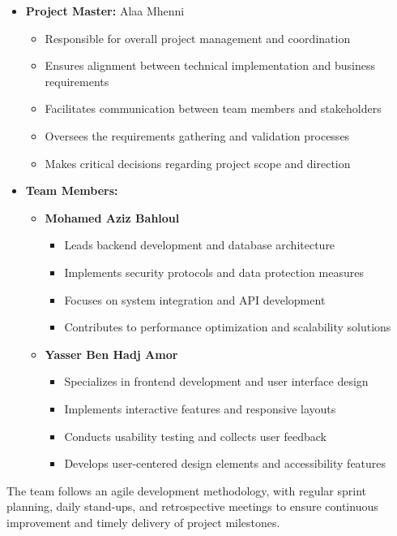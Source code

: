\begin{itemize}
    \item \textbf{Project Master:} Alaa Mhenni
    \begin{itemize}
        \item Responsible for overall project management and coordination
        \item Ensures alignment between technical implementation and business requirements
        \item Facilitates communication between team members and stakeholders
        \item Oversees the requirements gathering and validation processes
        \item Makes critical decisions regarding project scope and direction
    \end{itemize}
    
    \item \textbf{Team Members:}
    \begin{itemize}
        \item \textbf{Mohamed Aziz Bahloul}
        \begin{itemize}
            \item Leads backend development and database architecture
            \item Implements security protocols and data protection measures
            \item Focuses on system integration and API development
            \item Contributes to performance optimization and scalability solutions
        \end{itemize}
        
        \item \textbf{Yasser Ben Hadj Amor}
        \begin{itemize}
            \item Specializes in frontend development and user interface design
            \item Implements interactive features and responsive layouts
            \item Conducts usability testing and collects user feedback
            \item Develops user-centered design elements and accessibility features
        \end{itemize}
    \end{itemize}
\end{itemize}

The team follows an agile development methodology, with regular sprint planning, daily stand-ups, and retrospective meetings to ensure continuous improvement and timely delivery of project milestones.

